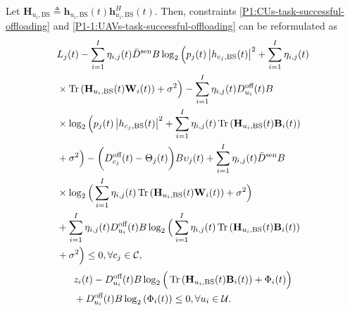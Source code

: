 \documentclass[10pt,journal,compsoc]{IEEEtran}
\begin{document}
Let $\mathbf{H}_{u_{i},\text{BS}} \triangleq \bm{h}_{u_{i}, \text{BS}}(t)\bm{h}^{H}_{u_{i}, \text{BS}}(t)$. 
Then, constraints \eqref{P1:CUs-task-successful-offloading} and \eqref{P1-1:UAVs-task-successful-offloading} can be reformulated as
\begin{align}\label{P2:CUs-task-successful-offloading}
    & L_{j}(t) - \sum_{i = 1}^{I} \eta_{i, j}(t) \bar{D}^{\text{sen}} B \log_{2}\Big( p_{j}(t) \left|h_{c_{j}, \text{BS}}(t)\right|^{2} + \sum_{i = 1}^{I} \eta_{i, j}(t) \notag \\
    & \times \operatorname{Tr}\left(\mathbf{H}_{u_{i}, \text{BS}}(t)\mathbf{W}_{i}(t)\right) + \sigma^{2}\Big) - \sum_{i = 1}^{I} \eta_{i, j}(t) D_{u_{i}}^{\text{off}}(t)B \notag \\
    & \times \log_{2}\Big(p_{j}(t) \left|h_{c_{j}, \text{BS}}(t)\right|^{2} + \sum_{i = 1}^{I} \eta_{i, j}(t) \operatorname{Tr}\left(\mathbf{H}_{u_{i}, \text{BS}}(t)\mathbf{B}_{i}(t)\right) \notag \\
    & + \sigma^{2}\Big) - \bigg(D_{c_{j}}^{\text{off}}(t) - \Theta_{j}(t)\bigg) B \upsilon_{j}(t) + \sum_{i = 1}^{I} \eta_{i, j}(t) \bar{D}^{\text{sen}} B  \notag \\
    & \times \log_{2}\Big( \sum_{i = 1}^{I} \eta_{i, j}(t) \operatorname{Tr}\left(\mathbf{H}_{u_{i}, \text{BS}}(t)\mathbf{W}_{i}(t)\right) + \sigma^{2}\Big) \notag \\
    & + \sum_{i = 1}^{I} \eta_{i, j}(t) D_{u_{i}}^{\text{off}}(t) B \log_{2}\Big( \sum_{i = 1}^{I} \eta_{i, j}(t) \operatorname{Tr}\left(\mathbf{H}_{u_{i}, \text{BS}}(t)\mathbf{B}_{i}(t)\right) \notag \\
    &  + \sigma^{2}\Big)  \le 0, \forall c_{j} \in \mathcal{C},
\end{align}
\begin{align}\label{P2:UAVs-task-successful-offloading}
    & z_{i}(t) - D_{u_{i}}^{\text{off}}(t) B \log_{2}\Big(\operatorname{Tr}\left(\mathbf{H}_{u_{i},\text{BS}}(t)\mathbf{B}_{i}(t)\right) + \Phi_{i}(t) \Big) \notag \\
    & + D_{u_{i}}^{\text{off}}(t) B \log_{2}\left(\Phi_{i}(t)\right) \le 0, \forall u_{i} \in \mathcal{U}.
\end{align}
\end{document}

